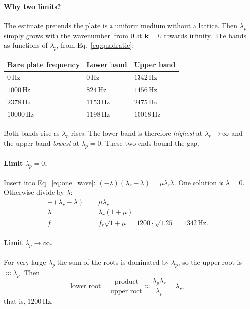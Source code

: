 \paragraph{Why two limits?}
The estimate pretends the plate is a uniform medium without a lattice. Then
$\lambda_p$ simply grows with the wavenumber, from $0$ at $\mathbf{k}=0$ towards
infinity. The bands as functions of $\lambda_p$, from Eq.~\eqref{eq:quadratic}:
\begin{center}
\begin{tabular}{|l|l|l|}
\hline
Bare plate frequency & Lower band & Upper band \\
\hline
$0\,\mathrm{Hz}$ & $0\,\mathrm{Hz}$ & $1342\,\mathrm{Hz}$ \\
$1000\,\mathrm{Hz}$ & $824\,\mathrm{Hz}$ & $1456\,\mathrm{Hz}$ \\
$2378\,\mathrm{Hz}$ & $1153\,\mathrm{Hz}$ & $2475\,\mathrm{Hz}$ \\
$10000\,\mathrm{Hz}$ & $1198\,\mathrm{Hz}$ & $10018\,\mathrm{Hz}$ \\
\hline
\end{tabular}
\end{center}
Both bands rise as $\lambda_p$ rises. The lower band is therefore \emph{highest}
at $\lambda_p \to \infty$ and the upper band \emph{lowest} at $\lambda_p = 0$.
These two ends bound the gap.

\paragraph{Limit $\lambda_p = 0$.}
Insert into Eq.~\eqref{eq:one_wave}:
$(-\lambda)(\lambda_r - \lambda) = \mu\lambda_r\lambda$. One solution is
$\lambda = 0$. Otherwise divide by $\lambda$:
\begin{align}
  -(\lambda_r - \lambda) &= \mu\lambda_r \\
  \lambda &= \lambda_r(1+\mu) \\
  f &= f_r\sqrt{1+\mu} = 1200\cdot\sqrt{1.25} = 1342\,\mathrm{Hz}.
\end{align}

\paragraph{Limit $\lambda_p \to \infty$.}
For very large $\lambda_p$ the sum of the roots is dominated by $\lambda_p$, so
the upper root is $\approx \lambda_p$. Then
\begin{equation}
  \text{lower root} = \frac{\text{product}}{\text{upper root}}
  \approx \frac{\lambda_p\lambda_r}{\lambda_p} = \lambda_r ,
\end{equation}
that is, $1200\,\mathrm{Hz}$.

